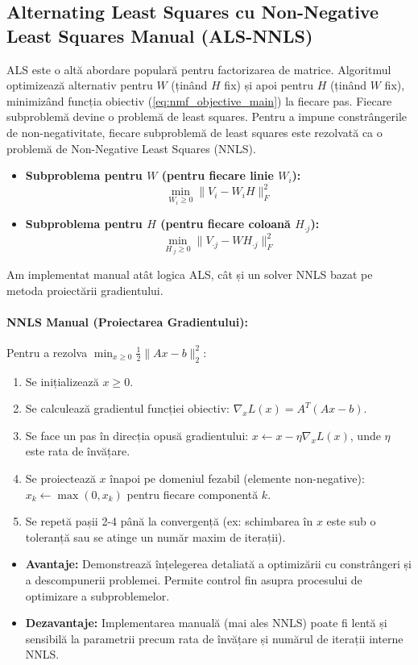 \documentclass[12pt,a4paper]{article}
\begin{document}
	\subsection{Alternating Least Squares cu Non-Negative Least Squares Manual (ALS-NNLS)}
	ALS este o altă abordare populară pentru factorizarea de matrice. Algoritmul optimizează alternativ pentru $W$ (ținând $H$ fix) și apoi pentru $H$ (ținând $W$ fix), minimizând funcția obiectiv (\ref{eq:nmf_objective_main}) la fiecare pas. Fiecare subproblemă devine o problemă de least squares. Pentru a impune constrângerile de non-negativitate, fiecare subproblemă de least squares este rezolvată ca o problemă de Non-Negative Least Squares (NNLS).
	\begin{itemize}
		\item \textbf{Subproblema pentru $W$ (pentru fiecare linie $W_i$):}
		$$ \min_{W_i \ge 0} \| V_i - W_i H \|_F^2 $$
		\item \textbf{Subproblema pentru $H$ (pentru fiecare coloană $H_{\cdot j}$):}
		$$ \min_{H_{\cdot j} \ge 0} \| V_{\cdot j} - W H_{\cdot j} \|_F^2 $$
	\end{itemize}
	Am implementat manual atât logica ALS, cât și un solver NNLS bazat pe metoda proiectării gradientului.
	\paragraph{NNLS Manual (Proiectarea Gradientului):}
	Pentru a rezolva $\min_{x \ge 0} \frac{1}{2}\|Ax - b\|_2^2$:
	\begin{enumerate}
		\item Se inițializează $x \ge 0$.
		\item Se calculează gradientul funcției obiectiv: $\nabla_x L(x) = A^T (Ax - b)$.
		\item Se face un pas în direcția opusă gradientului: $x \leftarrow x - \eta \nabla_x L(x)$, unde $\eta$ este rata de învățare.
		\item Se proiectează $x$ înapoi pe domeniul fezabil (elemente non-negative): $x_k \leftarrow \max(0, x_k)$ pentru fiecare componentă $k$.
		\item Se repetă pașii 2-4 până la convergență (ex: schimbarea în $x$ este sub o toleranță sau se atinge un număr maxim de iterații).
	\end{enumerate}
	\begin{itemize}
		\item \textbf{Avantaje:} Demonstrează înțelegerea detaliată a optimizării cu constrângeri și a descompunerii problemei. Permite control fin asupra procesului de optimizare a subproblemelor.
		\item \textbf{Dezavantaje:} Implementarea manuală (mai ales NNLS) poate fi lentă și sensibilă la parametrii precum rata de învățare și numărul de iterații interne NNLS.
	\end{itemize}
\end{document}
